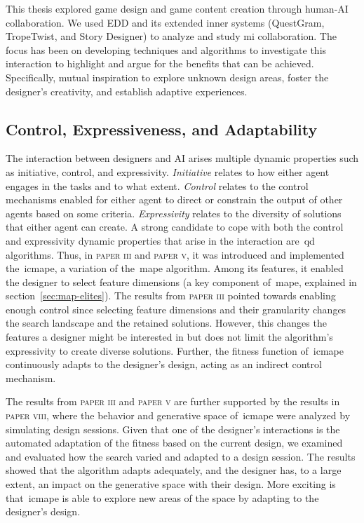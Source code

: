 This thesis explored game design and game content creation through human-AI collaboration. We used EDD and its extended inner systems (QuestGram, TropeTwist, and Story Designer) to analyze and study \acrshort{mi} collaboration. The focus has been on developing techniques and algorithms to investigate this interaction to highlight and argue for the benefits that can be achieved. Specifically, mutual inspiration to explore unknown design areas, foster the designer's creativity, and establish adaptive experiences.

\subsection{Control, Expressiveness, and Adaptability}

The interaction between designers and AI arises multiple dynamic properties such as initiative, control, and expressivity. \emph{Initiative} relates to how either agent engages in the tasks and to what extent. \emph{Control} relates to the control mechanisms enabled for either agent to direct or constrain the output of other agents based on some criteria. \emph{Expressivity} relates to the diversity of solutions that either agent can create. A strong candidate to cope with both the control and expressivity dynamic properties that arise in the interaction are~\acrshort{qd} algorithms. Thus, in \textsc{paper iii} and \textsc{paper v}, it was introduced and implemented the~\acrlong{icmape}, a variation of the~\acrshort{mape} algorithm. Among its features, it enabled the designer to select feature dimensions (a key component of~\acrshort{mape}, explained in section~\ref{sec:map-elites}). The results from \textsc{paper iii} pointed towards enabling enough control since selecting feature dimensions and their granularity changes the search landscape and the retained solutions. However, this changes the features a designer might be interested in but does not limit the algorithm's expressivity to create diverse solutions. Further, the fitness function of~\acrshort{icmape} continuously adapts to the designer's design, acting as an indirect control mechanism.

The results from \textsc{paper iii} and \textsc{paper v} are further supported by the results in \textsc{paper viii}, where the behavior and generative space of~\acrshort{icmape} were analyzed by simulating design sessions. Given that one of the designer's interactions is the automated adaptation of the fitness based on the current design, we examined and evaluated how the search varied and adapted to a design session. The results showed that the algorithm adapts adequately, and the designer has, to a large extent, an impact on the generative space with their design. More exciting is that~\acrshort{icmape} is able to explore new areas of the space by adapting to the designer's design.

